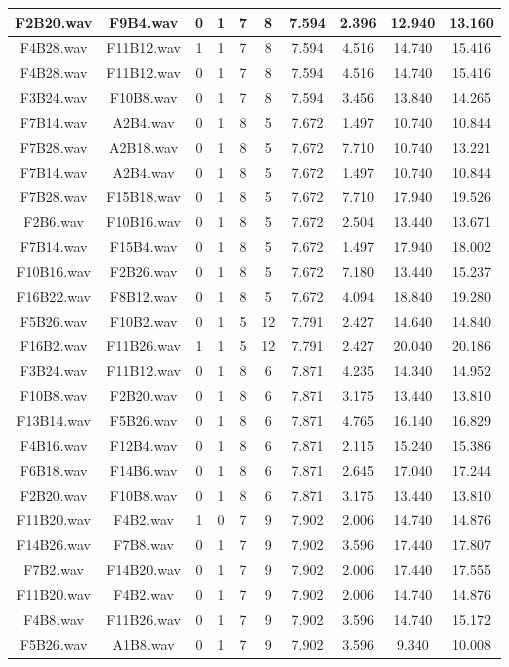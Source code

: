 \documentclass[11pt,a4paper]{book}
\begin{document}
\begin{longtable}[c]{|c|c|c|c|c|c|c|c|c|c|}
F2B20.wav&F9B4.wav&0&1&7&8&7.594&2.396&12.940&13.160\\ \hline
F4B28.wav&F11B12.wav&1&1&7&8&7.594&4.516&14.740&15.416\\ \hline
F4B28.wav&F11B12.wav&0&1&7&8&7.594&4.516&14.740&15.416\\ \hline
F3B24.wav&F10B8.wav&0&1&7&8&7.594&3.456&13.840&14.265\\ \hline
F7B14.wav&A2B4.wav&0&1&8&5&7.672&1.497&10.740&10.844\\ \hline
F7B28.wav&A2B18.wav&0&1&8&5&7.672&7.710&10.740&13.221\\ \hline
F7B14.wav&A2B4.wav&0&1&8&5&7.672&1.497&10.740&10.844\\ \hline
F7B28.wav&F15B18.wav&0&1&8&5&7.672&7.710&17.940&19.526\\ \hline
F2B6.wav&F10B16.wav&0&1&8&5&7.672&2.504&13.440&13.671\\ \hline
F7B14.wav&F15B4.wav&0&1&8&5&7.672&1.497&17.940&18.002\\ \hline
F10B16.wav&F2B26.wav&0&1&8&5&7.672&7.180&13.440&15.237\\ \hline
F16B22.wav&F8B12.wav&0&1&8&5&7.672&4.094&18.840&19.280\\ \hline
F5B26.wav&F10B2.wav&0&1&5&12&7.791&2.427&14.640&14.840\\ \hline
F16B2.wav&F11B26.wav&1&1&5&12&7.791&2.427&20.040&20.186\\ \hline
F3B24.wav&F11B12.wav&0&1&8&6&7.871&4.235&14.340&14.952\\ \hline
F10B8.wav&F2B20.wav&0&1&8&6&7.871&3.175&13.440&13.810\\ \hline
F13B14.wav&F5B26.wav&0&1&8&6&7.871&4.765&16.140&16.829\\ \hline
F4B16.wav&F12B4.wav&0&1&8&6&7.871&2.115&15.240&15.386\\ \hline
F6B18.wav&F14B6.wav&0&1&8&6&7.871&2.645&17.040&17.244\\ \hline
F2B20.wav&F10B8.wav&0&1&8&6&7.871&3.175&13.440&13.810\\ \hline
F11B20.wav&F4B2.wav&1&0&7&9&7.902&2.006&14.740&14.876\\ \hline
F14B26.wav&F7B8.wav&0&1&7&9&7.902&3.596&17.440&17.807\\ \hline
F7B2.wav&F14B20.wav&0&1&7&9&7.902&2.006&17.440&17.555\\ \hline
F11B20.wav&F4B2.wav&0&1&7&9&7.902&2.006&14.740&14.876\\ \hline
F4B8.wav&F11B26.wav&0&1&7&9&7.902&3.596&14.740&15.172\\ \hline
F5B26.wav&A1B8.wav&0&1&7&9&7.902&3.596&9.340&10.008\\ \hline

\end{longtable}
\end{document}
